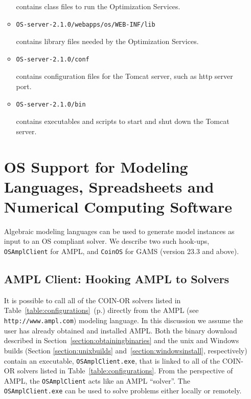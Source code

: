 \documentclass[11pt]{article}
\renewcommand{\_}{{\char"5F}}
\renewcommand{\{}{{\char"7B}}
\renewcommand{\}}{{\char"7D}}
\renewcommand{\^}{{\char"0D}}
\renewcommand{\'}{{\char"0D}}
\begin{document}
\begin{enumerate}[Step 1:]
\begin{itemize}
contains class files to run the Optimization Services.
\item
\begin{verbatim}
OS-server-2.1.0/webapps/os/WEB-INF/lib
\end{verbatim}
contains library files needed by the Optimization Services.
\item
\begin{verbatim}
OS-server-2.1.0/conf
\end{verbatim}
contains configuration files for the Tomcat server, such as http server port.
\item
\begin{verbatim}
OS-server-2.1.0/bin
\end{verbatim}
contains executables and scripts to start and shut down the Tomcat server.
\end{itemize}



\section{OS Support for Modeling Languages, Spreadsheets and Numerical Computing Software}\label{section:modellang}

Algebraic modeling languages can be used to generate model instances as input to an OS compliant solver.
We describe two such hook-ups, {\tt OSAmplClient} for AMPL, and {\tt CoinOS} for GAMS (version 23.3 and above).


\subsection{AMPL Client:  Hooking AMPL to Solvers}\label{section:amplclient}





It is possible to call all of the COIN-OR solvers listed in %
Table~\ref{table:configurations}~(p.\pageref{table:configurations})
directly from the  AMPL (see {\tt http://www.ampl.com}) modeling language.  In this discussion we assume 
the user has already obtained and installed AMPL.  
Both the binary download described in Section~\ref{section:obtainingbinaries}
and the unix and Windows builds (Section \ref{section:unixbuilds}
and~\ref{section:windowsinstall}, respectively) contain
an executable, {\tt OSAmplClient.exe},
that is linked to all of the COIN-OR solvers  listed in Table~\ref{table:configurations}. %
From the  perspective of AMPL, the   {\tt OSAmplClient} acts like an AMPL ``solver''.    
The {\tt OSAmplClient.exe}   can be used to solve problems either locally or remotely.   



\end{enumerate}
\end{document}
